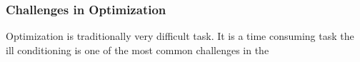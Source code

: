 \subsubsection{Challenges in Optimization}

Optimization is traditionally very difficult task. It is a time consuming task 
the ill conditioning is one of the most common challenges in the 